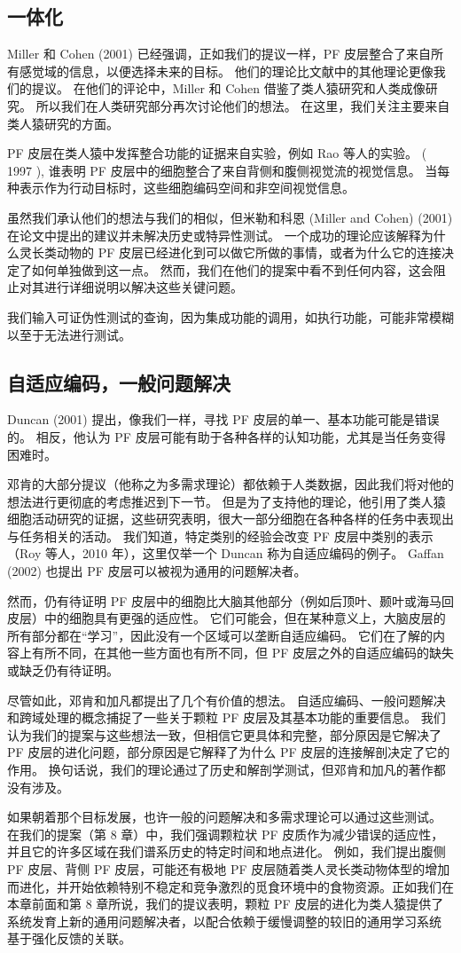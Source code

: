 \subsection{一体化} 
Miller 和 Cohen (2001) 已经强调，正如我们的提议一样，PF 皮层整合了来自所有感觉域的信息，以便选择未来的目标。 他们的理论比文献中的其他理论更像我们的提议。 在他们的评论中，Miller 和 Cohen 借鉴了类人猿研究和人类成像研究。 所以我们在人类研究部分再次讨论他们的想法。 在这里，我们关注主要来自类人猿研究的方面。
\par 
PF 皮层在类人猿中发挥整合功能的证据来自实验，例如 Rao 等人的实验。 ( 1997 ), 谁表明 PF 皮层中的细胞整合了来自背侧和腹侧视觉流的视觉信息。 当每种表示作为行动目标时，这些细胞编码空间和非空间视觉信息。
\par 
虽然我们承认他们的想法与我们的相似，但米勒和科恩 (Miller and Cohen) (2001) 在论文中提出的建议并未解决历史或特异性测试。 一个成功的理论应该解释为什么灵长类动物的 PF 皮层已经进化到可以做它所做的事情，或者为什么它的连接决定了如何单独做到这一点。 然而，我们在他们的提案中看不到任何内容，这会阻止对其进行详细说明以解决这些关键问题。
\par 
我们输入可证伪性测试的查询，因为集成功能的调用，如执行功能，可能非常模糊以至于无法进行测试。
\subsection{自适应编码，一般问题解决}
Duncan (2001) 提出，像我们一样，寻找 PF 皮层的单一、基本功能可能是错误的。 相反，他认为 PF 皮层可能有助于各种各样的认知功能，尤其是当任务变得困难时。
\par 
邓肯的大部分提议（他称之为多需求理论）都依赖于人类数据，因此我们将对他的想法进行更彻底的考虑推迟到下一节。 但是为了支持他的理论，他引用了类人猿细胞活动研究的证据，这些研究表明，很大一部分细胞在各种各样的任务中表现出与任务相关的活动。 我们知道，特定类别的经验会改变 PF 皮层中类别的表示（Roy 等人，2010 年），这里仅举一个 Duncan 称为自适应编码的例子。 Gaffan (2002) 也提出 PF 皮层可以被视为通用的问题解决者。
\par 
然而，仍有待证明 PF 皮层中的细胞比大脑其他部分（例如后顶叶、颞叶或海马回皮层）中的细胞具有更强的适应性。 它们可能会，但在某种意义上，大脑皮层的所有部分都在“学习”，因此没有一个区域可以垄断自适应编码。 它们在了解的内容上有所不同，在其他一些方面也有所不同，但 PF 皮层之外的自适应编码的缺失或缺乏仍有待证明。
\par 
尽管如此，邓肯和加凡都提出了几个有价值的想法。 自适应编码、一般问题解决和跨域处理的概念捕捉了一些关于颗粒 PF 皮层及其基本功能的重要信息。 我们认为我们的提案与这些想法一致，但相信它更具体和完整，部分原因是它解决了 PF 皮层的进化问题，部分原因是它解释了为什么 PF 皮层的连接解剖决定了它的作用。 换句话说，我们的理论通过了历史和解剖学测试，但邓肯和加凡的著作都没有涉及。
\par 
如果朝着那个目标发展，也许一般的问题解决和多需求理论可以通过这些测试。 在我们的提案（第 8 章）中，我们强调颗粒状 PF 皮质作为减少错误的适应性，并且它的许多区域在我们谱系历史的特定时间和地点进化。 例如，我们提出腹侧PF 皮层、背侧 PF 皮层，可能还有极地 PF 皮层随着类人灵长类动物体型的增加而进化，并开始依赖特别不稳定和竞争激烈的觅食环境中的食物资源。正如我们在本章前面和第 8 章所说，我们的提议表明，颗粒 PF 皮层的进化为类人猿提供了系统发育上新的通用问题解决者，以配合依赖于缓慢调整的较旧的通用学习系统 基于强化反馈的关联。
